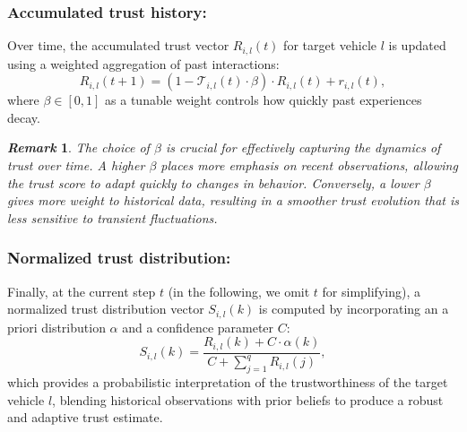\documentclass{ifacconf}
\def\T{\mathcal{T}} %
\newtheorem{remark}{\it \textbf{Remark}}%
\begin{document}
\subsubsection{Accumulated trust history:}
Over time, the accumulated trust vector $R_{i,l}(t)$ for target vehicle $l$ is updated using a weighted aggregation of past interactions: 
\begin{equation}
    R_{i,l}(t + 1) = \left(1 - \T_{i,l}(t) \cdot \beta \right) \cdot R_{i,l}(t) + r_{i,l}(t),
\end{equation}
where $\beta \in [0, 1]$ as a tunable weight controls how quickly past experiences decay. 

\begin{remark}
    The choice of $\beta$ is crucial for effectively capturing the dynamics of trust over time. 
    A higher $\beta$ places more emphasis on recent observations, allowing the trust score to adapt quickly to changes in behavior. 
    Conversely, a lower $\beta$ gives more weight to historical data, resulting in a smoother trust evolution that is less sensitive to transient fluctuations.
\end{remark}
\subsubsection{Normalized trust distribution:}
Finally, at the current step $t$ (in the following, we omit $t$ for simplifying), a normalized trust distribution vector $S_{i,l}(k)$ is computed by incorporating an a priori distribution $\alpha$ and a confidence parameter $C$:
\begin{equation}
    S_{i,l}(k) = \dfrac{R_{i,l}(k) + C \cdot \alpha(k)}{C + \sum_{j=1}^{q} R_{i,l}(j)},
\end{equation}
which provides a probabilistic interpretation of the trustworthiness of the target vehicle $l$, blending historical observations with prior beliefs to produce a robust and adaptive trust estimate. 
\end{document}
